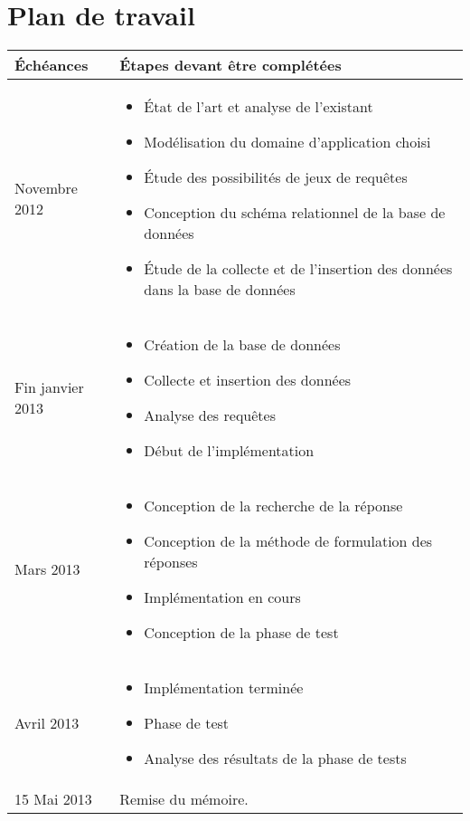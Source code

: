 \documentclass[a4paper,12pt]{article}
\begin{document}
\section{Plan de travail}
\begin{tabular}{p{4cm} p{9cm}}
  \toprule
  \large{Échéances} & \large{Étapes devant être complétées} \\
  \midrule
  \large{Novembre 2012} & \begin{itemize}
    \item État de l'art et analyse de l'existant
    \item Modélisation du domaine d'application choisi
    \item Étude des possibilités de jeux de requêtes
    \item Conception du schéma relationnel de la base de données
    \item Étude de la collecte et de l'insertion des données dans la base de données
  \end{itemize}
  \\
  \large{Fin janvier 2013} & \begin{itemize}
    \item Création de la base de données
    \item Collecte et insertion des données
    \item Analyse des requêtes
    \item Début de l'implémentation
  \end{itemize}
  \\
  \large{Mars 2013} & \begin{itemize}
    \item Conception de la recherche de la réponse
    \item Conception de la méthode de formulation des réponses
    \item Implémentation en cours
    \item Conception de la phase de test
  \end{itemize}
  \\
  \large{Avril 2013} & \begin{itemize}
    \item Implémentation terminée
    \item Phase de test
    \item Analyse des résultats de la phase de tests
  \end{itemize}
  \\
  \large{15 Mai 2013} & Remise du mémoire. \\
  \bottomrule
\end{tabular}
\end{document}
